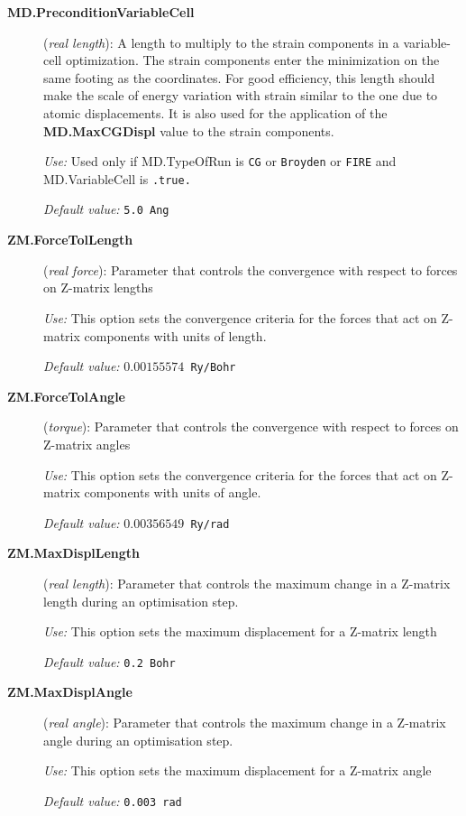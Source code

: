 \documentclass[11pt]{article}
\begin{document}
\begin{description}
\item[{\bf MD.PreconditionVariableCell}] ({\it real length}):
   A length to multiply to the strain
  components in a variable-cell optimization.  The strain components
  enter the minimization on the same footing as the coordinates. For
  good efficiency, this length should make the scale of energy
  variation with strain similar to the one due to atomic
  displacements. It is also used for the application of the {\bf
    MD.MaxCGDispl} value to the strain components.

{\it Use:} Used only if MD.TypeOfRun is {\tt CG} or {\tt Broyden} or
{\tt FIRE} and MD.VariableCell is {\tt .true.}

{\it Default value:} {\tt 5.0 Ang}

\item[{\bf ZM.ForceTolLength}] ({\it real force}):
   Parameter that
  controls the convergence with respect to forces on Z-matrix lengths

{\it Use:} This option sets the convergence criteria for the forces that
act on Z-matrix components with units of length.

{\it Default value:} {\tt $0.00155574$ Ry/Bohr}

\item[{\bf ZM.ForceTolAngle}] ({\it torque}):
   Parameter that
  controls the convergence with respect to forces on Z-matrix angles

{\it Use:} This option sets the convergence criteria for the forces that
act on Z-matrix components with units of angle.

{\it Default value:} {\tt $0.00356549$ Ry/rad}

\item[{\bf ZM.MaxDisplLength}] ({\it real length}):
   Parameter that
  controls the maximum change in a Z-matrix length during an
  optimisation step.

{\it Use:} This option sets the maximum displacement for a Z-matrix length

{\it Default value:} {\tt 0.2 Bohr}

\item[{\bf ZM.MaxDisplAngle}] ({\it real angle}):
   Parameter that
  controls the maximum change in a Z-matrix angle during an
  optimisation step.

{\it Use:} This option sets the maximum displacement for a Z-matrix angle

{\it Default value:} {\tt 0.003 rad }

\end{description}
\end{document}
